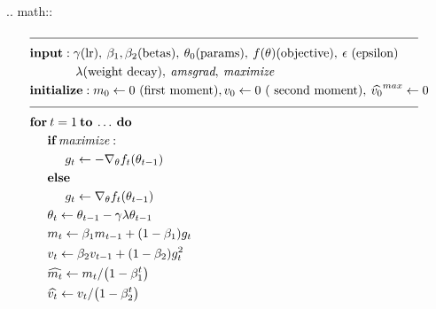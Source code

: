 \documentclass[]{article}
\begin{document}
.. math::
    \begin{align}
&\rule{110mm}{0.4pt}                                                                 \\
&\textbf{input}      : \gamma \text{(lr)}, \: \beta_1, \beta_2
    \text{(betas)}, \: \theta_0 \text{(params)}, \: f(\theta) \text{(objective)},
    \: \epsilon \text{ (epsilon)}                                                    \\
&\hspace{13mm}      \lambda \text{(weight decay)},  \: \textit{amsgrad},
    \: \textit{maximize}                                                             \\
&\textbf{initialize} : m_0 \leftarrow 0 \text{ (first moment)}, v_0 \leftarrow 0
    \text{ ( second moment)}, \: \widehat{v_0}^{max}\leftarrow 0              \\[-1.ex]
&\rule{110mm}{0.4pt}                                                                 \\
&\textbf{for} \: t=1 \: \textbf{to} \: \ldots \: \textbf{do}                         \\
&\hspace{5mm}\textbf{if} \: \textit{maximize}:                                       \\
&\hspace{10mm}g_t           \leftarrow   -\nabla_{\theta} f_t (\theta_{t-1})          \\
&\hspace{5mm}\textbf{else}                                                           \\
&\hspace{10mm}g_t           \leftarrow   \nabla_{\theta} f_t (\theta_{t-1})           \\
&\hspace{5mm} \theta_t \leftarrow \theta_{t-1} - \gamma \lambda \theta_{t-1}         \\
&\hspace{5mm}m_t           \leftarrow   \beta_1 m_{t-1} + (1 - \beta_1) g_t          \\
&\hspace{5mm}v_t           \leftarrow   \beta_2 v_{t-1} + (1-\beta_2) g^2_t          \\
&\hspace{5mm}\widehat{m_t} \leftarrow   m_t/\big(1-\beta_1^t \big)                   \\
&\hspace{5mm}\widehat{v_t} \leftarrow   v_t/\big(1-\beta_2^t \big)                   \\

\end{align}
\end{document}
